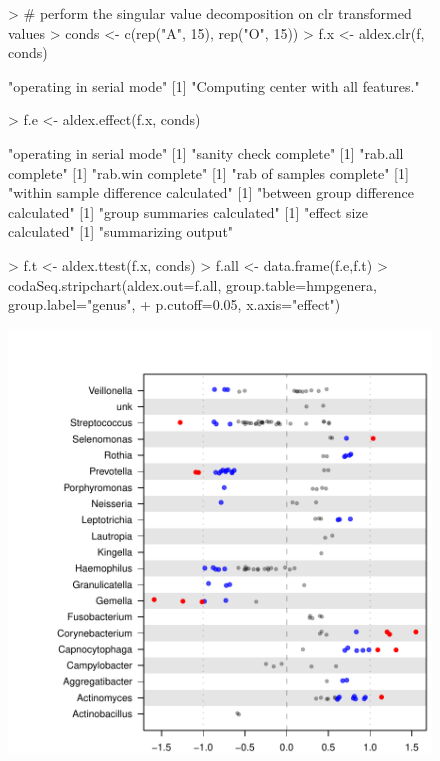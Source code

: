 \documentclass[11pt]{article}
\begin{document}
\begin{figure}\label{strip chart}
\begin{center}
\begin{Schunk}
\begin{Sinput}
> # perform the singular value decomposition on clr transformed values
> conds <- c(rep("A", 15), rep("O", 15))
> f.x <- aldex.clr(f, conds)
\end{Sinput}
\begin{Soutput}
[1] "operating in serial mode"
[1] "Computing center with all features."
\end{Soutput}
\begin{Sinput}
> f.e <- aldex.effect(f.x, conds)
\end{Sinput}
\begin{Soutput}
[1] "operating in serial mode"
[1] "sanity check complete"
[1] "rab.all  complete"
[1] "rab.win  complete"
[1] "rab of samples complete"
[1] "within sample difference calculated"
[1] "between group difference calculated"
[1] "group summaries calculated"
[1] "effect size calculated"
[1] "summarizing output"
\end{Soutput}
\begin{Sinput}
> f.t <- aldex.ttest(f.x, conds)
> f.all <- data.frame(f.e,f.t)
> codaSeq.stripchart(aldex.out=f.all, group.table=hmpgenera, group.label="genus", 
+     p.cutoff=0.05, x.axis="effect")
\end{Sinput}
\end{Schunk}
\includegraphics{CoDaSeq_vignette-004}
\end{center}
\end{figure}
 
\end{document}

